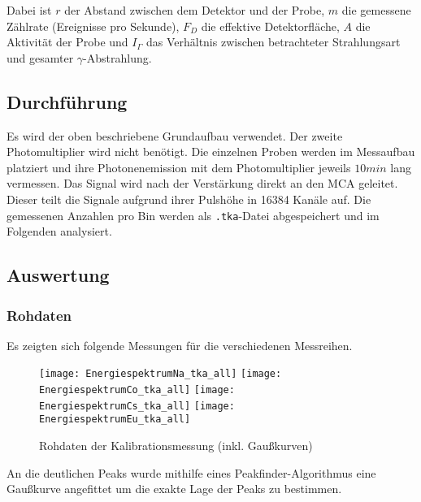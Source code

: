 \documentclass{../Misc/MontavonLaTeX/Montavon}
\newcommand{\halfwidth}{0.48\textwidth}
\begin{document}
Dabei ist $r$ der Abstand zwischen dem Detektor und der Probe, $m$ die gemessene Zählrate (Ereignisse pro Sekunde), $F_D$ die effektive Detektorfläche, $A$ die Aktivität der Probe und $I_\Gamma$ das Verhältnis zwischen betrachteter Strahlungsart und gesamter $\gamma$-Abstrahlung.

\subsection{Durchführung}
Es wird der oben beschriebene Grundaufbau verwendet. Der zweite Photomultiplier wird nicht benötigt. Die einzelnen Proben werden im Messaufbau platziert und ihre Photonenemission mit dem Photomultiplier jeweils $10 \unit{min}$ lang  vermessen. Das Signal wird nach der  Verstärkung direkt an den MCA geleitet. Dieser teilt die Signale aufgrund ihrer Pulshöhe in 16384 Kanäle auf. Die gemessenen Anzahlen pro Bin werden als \texttt{.tka}-Datei abgespeichert und im Folgenden analysiert.

\subsection{Auswertung}
\subsubsection{Rohdaten}
Es zeigten sich folgende Messungen für die verschiedenen Messreihen. 
\begin{figure}[htbp]
\centering
\texttt{[image: EnergiespektrumNa\_tka\_all]}
\texttt{[image: EnergiespektrumCo\_tka\_all]}
\texttt{[image: EnergiespektrumCs\_tka\_all]}
\texttt{[image: EnergiespektrumEu\_tka\_all]}
\caption{Rohdaten der Kalibrationsmessung (inkl. Gaußkurven)}
\label{fig:Kalib}
\end{figure}

An die deutlichen Peaks wurde mithilfe eines Peakfinder-Algorithmus eine Gaußkurve angefittet um die exakte Lage der Peaks zu bestimmen. 
\end{document}
